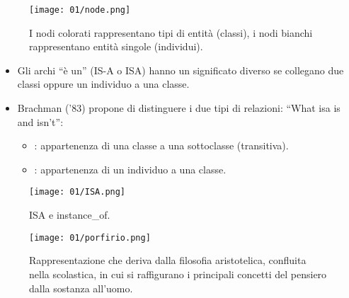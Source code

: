 
\begin{figure}[h]
    \centering
    \texttt{[image: 01/node.png]}
    \caption{I nodi colorati rappresentano tipi di entità (classi), i nodi bianchi
rappresentano entità singole (individui).}
\end{figure}


\begin{itemize}
  \item Gli archi “è un” (IS-A o ISA) hanno un significato diverso
se collegano due classi oppure un individuo a una classe. 
\item Brachman ('83) propone di distinguere i due tipi di
relazioni: “What isa is and isn’t”: 
\begin{itemize}
  \item {}: appartenenza di una classe a una sottoclasse
(transitiva).
\item {}: appartenenza di un individuo a una classe.
\end{itemize}
\end{itemize}

\begin{figure}[h]
    \centering
    \texttt{[image: 01/ISA.png]}
    \caption{ISA e instance\_of.}
\end{figure}


\begin{figure}[h]
    \centering
    \texttt{[image: 01/porfirio.png]}
    \caption{Rappresentazione che deriva dalla filosofia aristotelica, confluita nella scolastica, in cui si raffigurano i principali concetti del pensiero dalla sostanza all'uomo.}
\end{figure}


